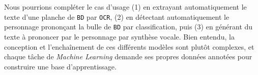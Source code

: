 			\begin{leftBarInformation}
				Nous pourrions compléter le cas d'usage
				(1) en extrayant automatiquement le texte d'une planche de \texttt{BD} par \texttt{OCR},
				(2) en détectant automatiquement le personnage prononçant la bulle de \texttt{BD} par classification,
				puis (3) en générant du texte à prononcer par le personnage par synthèse vocale.
				Bien entendu, la conception et l'enchaînement de ces différents modèles sont plutôt complexes, et chaque tâche de \textit{Machine Learning} demande ses propres données annotées pour construire une base d'apprentissage.
			\end{leftBarInformation}
			
			
		
